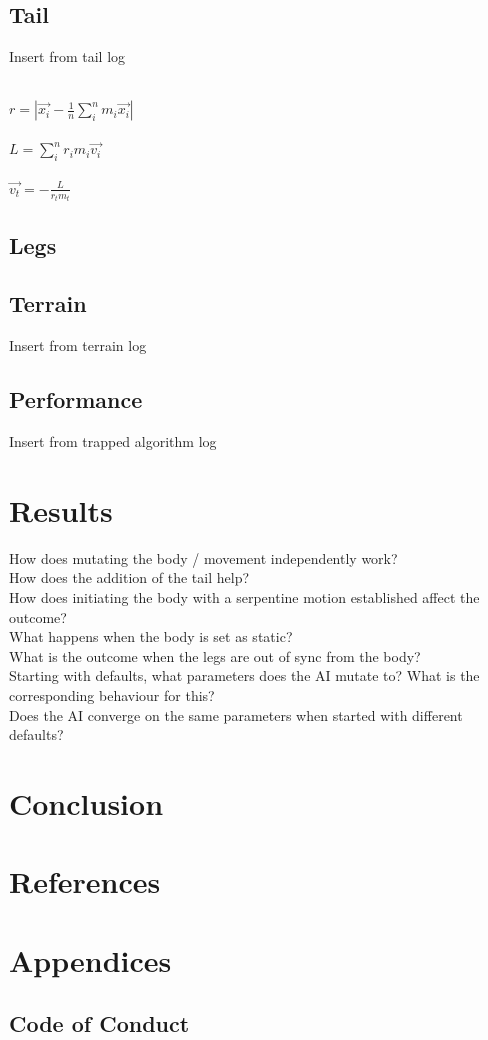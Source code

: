 \documentclass{article}
\begin{document}
\subsection{Tail}
Insert from tail log\\
\begin{Large}\\
$r = |\overrightarrow{x_{i}} - \frac{1}{n}\sum_{i}^{n}m_{i}\overrightarrow{x_{i}}|$\\\\
$L = \sum^{n}_{i} r_{i}m_{i}\overrightarrow{v_{i}}$\\\\
$\overrightarrow{v_{t}} = -\frac{L}{r_{t}m_{t}}$
\end{Large}

\subsection{Legs}
\subsection{Terrain}
Insert from terrain log
\subsection{Performance}
Insert from trapped algorithm log


\newpage
\section{Results}
How does mutating the body / movement independently work?\\
How does the addition of the tail help?\\
How does initiating the body with a serpentine motion established affect the outcome?\\
What happens when the body is set as static?\\
What is the outcome when the legs are out of sync from the body?\\
Starting with defaults, what parameters does the AI mutate to? What is the corresponding behaviour for this?\\
Does the AI converge on the same parameters when started with different defaults?\\



\newpage
\section{Conclusion}

\newpage
\section{References}

\newpage
\section{Appendices}
\subsection{Code of Conduct}
\end{document}
